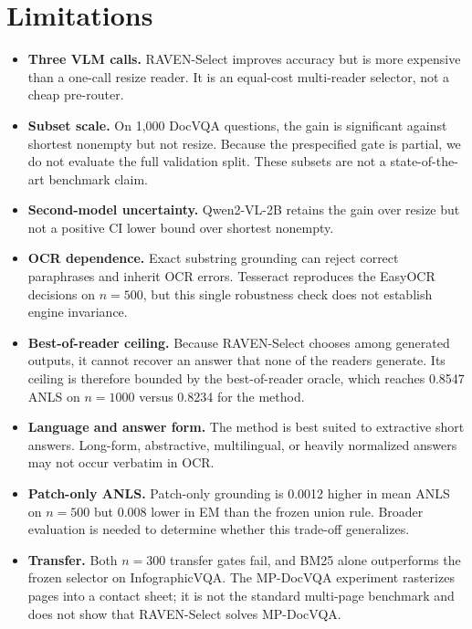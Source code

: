 \documentclass[journal]{IEEEtran}
\begin{document}
\section{Limitations}
\begin{itemize}[leftmargin=*]
  \item \textbf{Three VLM calls.}  RAVEN-Select improves accuracy but is more
  expensive than a one-call resize reader.  It is an equal-cost multi-reader
  selector, not a cheap pre-router.
  \item \textbf{Subset scale.}  On 1,000 DocVQA questions, the gain is
  significant against shortest nonempty but not resize.  Because the
  prespecified gate is partial, we do not evaluate the full validation split.
  These subsets are not a state-of-the-art benchmark claim.
  \item \textbf{Second-model uncertainty.}  Qwen2-VL-2B retains the gain over
  resize but not a positive CI lower bound over shortest nonempty.
  \item \textbf{OCR dependence.}  Exact substring grounding can reject correct
  paraphrases and inherit OCR errors.  Tesseract reproduces the EasyOCR
  decisions on $n=500$, but this single robustness check does not establish
  engine invariance.
  \item \textbf{Best-of-reader ceiling.}  Because RAVEN-Select chooses among
  generated outputs, it cannot recover an answer that none of the readers
  generate.  Its ceiling is therefore bounded by the best-of-reader oracle,
  which reaches 0.8547 ANLS on $n=1000$ versus 0.8234 for the method.
  \item \textbf{Language and answer form.}  The method is best suited to
  extractive short answers.  Long-form, abstractive, multilingual, or heavily
  normalized answers may not occur verbatim in OCR.
  \item \textbf{Patch-only ANLS.}  Patch-only grounding is 0.0012 higher in
  mean ANLS on $n=500$ but 0.008 lower in EM than the frozen union rule.
  Broader evaluation is needed to determine whether this trade-off generalizes.
  \item \textbf{Transfer.}  Both $n=300$ transfer gates fail, and BM25 alone
  outperforms the frozen selector on InfographicVQA.  The MP-DocVQA experiment
  rasterizes pages into a contact sheet; it is not the standard multi-page
  benchmark and does not show that RAVEN-Select solves MP-DocVQA.
\end{itemize}
\end{document}
